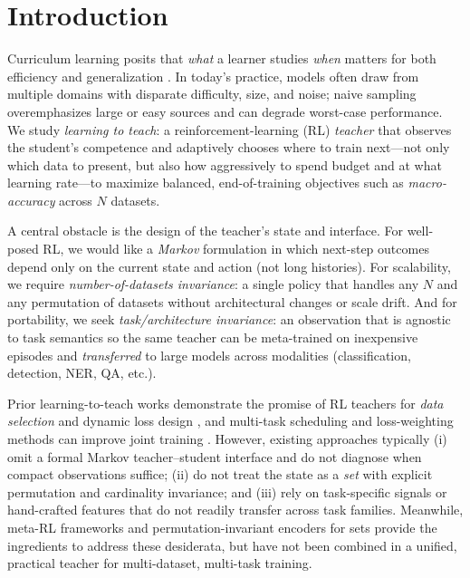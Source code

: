 \documentclass[11pt]{article}
\newcommand{\1}{\mathbf{1}}
\begin{document}
\section{Introduction}
Curriculum learning posits that \emph{what} a learner studies \emph{when} matters for both efficiency and generalization \citep{bengio2009curriculum,kumar2010selfpaced}. In today’s practice, models often draw from multiple domains with disparate difficulty, size, and noise; naive sampling overemphasizes large or easy sources and can degrade worst-case performance. We study \emph{learning to teach}: a reinforcement-learning (RL) \emph{teacher} that observes the student’s competence and adaptively chooses where to train next---not only which data to present, but also how aggressively to spend budget and at what learning rate---to maximize balanced, end-of-training objectives such as \emph{macro-accuracy} across $N$ datasets.

A central obstacle is the design of the teacher’s state and interface. For well-posed RL, we would like a \emph{Markov} formulation in which next-step outcomes depend only on the current state and action (not long histories). For scalability, we require \emph{number-of-datasets invariance}: a single policy that handles any $N$ and any permutation of datasets without architectural changes or scale drift. And for portability, we seek \emph{task/architecture invariance}: an observation that is agnostic to task semantics so the same teacher can be meta-trained on inexpensive episodes and \emph{transferred} to large models across modalities (classification, detection, NER, QA, etc.).

Prior learning-to-teach works demonstrate the promise of RL teachers for \emph{data selection} \citep{fan2018l2t} and dynamic loss design \citep{wu2018l2tloss}, and multi-task scheduling and loss-weighting methods can improve joint training \citep{kendall2018uncertainty,chen2018gradnorm}. However, existing approaches typically (i) omit a formal Markov teacher--student interface and do not diagnose when compact observations suffice; (ii) do not treat the state as a \emph{set} with explicit permutation and cardinality invariance; and (iii) rely on task-specific signals or hand-crafted features that do not readily transfer across task families. Meanwhile, meta-RL frameworks \citep{duan2016rl2,finn2017maml} and permutation-invariant encoders for sets \citep{zaheer2017deepsets,lee2019settransformer} provide the ingredients to address these desiderata, but have not been combined in a unified, practical teacher for multi-dataset, multi-task training.
\end{document}
